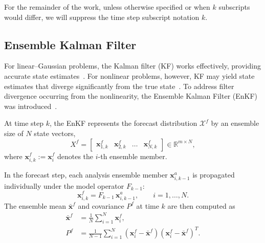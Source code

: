 \documentclass[11p]{elsarticle}
\numberwithin{equation}{section}
\newcommand{\vect}[1]{\ensuremath{\bm{#1}}}
\begin{document}
For the remainder of the work, unless otherwise specified or when $k$ subscripts would differ, we will suppress the time step subscript notation $k$.





\subsection{Ensemble Kalman Filter}
\label{sec:EnKF}
For linear--Gaussian problems, the Kalman filter (KF) works effectively,
providing accurate state estimates~\cite{Kalman1961}. For nonlinear
problems, however, KF may yield state estimates that diverge significantly
from the true state~\cite{Fitzgerald1971}. To address filter divergence occurring from the nonlinearity, the Ensemble Kalman Filter (EnKF) was
introduced~\cite{evensen2003ensemble}.

At time step $k$, the EnKF represents the forecast distribution
$\vect{\mathcal{X}}^f$ by {an ensemble size of $N$ state vectors},
\begin{equation}
    X^f = \begin{bmatrix}
        \vect{x}_{1,k}^f & \vect{x}_{2,k}^f & \dots  & \vect{x}_{N,k}^f
    \end{bmatrix} \in \mathbb{R}^{m \times N},
\end{equation}
where $\vect{x}_{i,k}^f := \vect{x}_{i}^f$ denotes the $i$-th ensemble member.

In the forecast step, each analysis ensemble member $\vect{x}^a_{i,k-1}$ is
propagated individually under the model operator $F_{k-1}$:
\begin{equation}
  \vect{x}_{i,k}^f = F_{k-1}\,\vect{x}^a_{i,k-1}, \qquad i=1,\dots,N.
\end{equation}
The ensemble mean $\vect{\bar{x}}^f$ and covariance $P^f$ at time $k$
are then computed as
\begin{align}
\vect{\bar{x}}^f &= \frac{1}{N} \sum_{i=1}^{N} \vect{x}_{i}^f, \\
P^f &= \frac{1}{N-1} \sum_{i=1}^{N}
(\vect{x}_{i}^f - \vect{\bar{x}}^f)(\vect{x}_{i}^f - \vect{\bar{x}}^f)^T.
\end{align}
\end{document}
